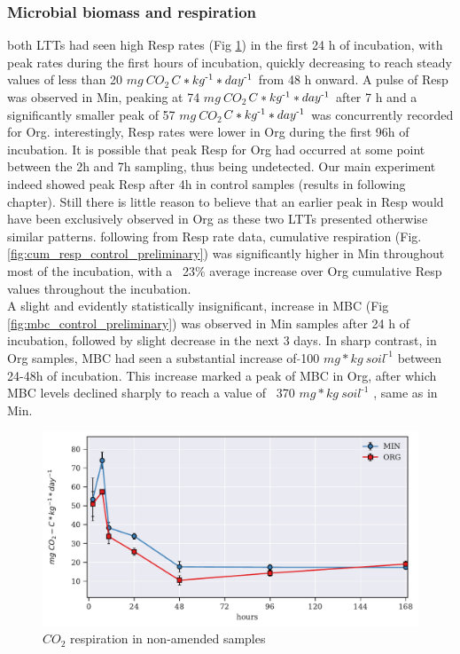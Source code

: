 \documentclass[12pt]{report}
\newlength{\SpaceAfterUnit}
\newcommand{\respunit}{$ mg\ CO_2$\text{-}$C * kg^{\text{-}1} * day^{\text{\text{-}}1}$ \hspace*{\SpaceAfterUnit}}
\newcommand{\genericunit}{$ mg * kg\ soil^{\text{-}1}$ \hspace*{\SpaceAfterUnit}}
\begin{document}
    \subsubsection{Microbial biomass and respiration}
        both LTTs had seen high Resp rates (Fig \ref{fig:resp_control_preliminary}) in the first 24 h of incubation, with peak rates during the first hours of incubation, quickly decreasing to reach steady values of less than 20 \respunit from 48 h onward. A pulse of Resp was observed in Min, peaking at 74   \respunit after 7 h and a significantly smaller peak of 57 \respunit was concurrently recorded for Org. interestingly, Resp rates were lower in Org during the first 96h of incubation. It is possible that peak Resp for Org had occurred at some point between the 2h and 7h  sampling, thus being undetected. Our main experiment indeed showed peak Resp after 4h in control samples (results in following chapter). Still there is little reason to believe that an earlier peak in Resp would have been exclusively observed in Org as these two LTTs presented otherwise similar patterns.
        following from Resp rate data, cumulative respiration (Fig. \ref{fig:cum_resp_control_preliminary}) was significantly higher in Min throughout most of the incubation, with a ~23$\%$ average increase over Org cumulative Resp values throughout the incubation.\\
        A slight and evidently statistically insignificant, increase in MBC (Fig \ref{fig:mbc_control_preliminary}) was observed in Min samples after 24 h of incubation, followed by slight decrease in the next 3 days.  In sharp contrast, in Org samples, MBC had seen a substantial increase of $ \tilde{} $100 \genericunit  between 24-48h of incubation. This increase marked a peak of MBC in Org, after which MBC levels declined sharply to reach a value of ~370 \genericunit, same as in Min.
    \begin{figure}[H]
        \centering
        \includegraphics[scale=0.8]{thesis_figures/preliminary/control/Resp.pdf}
        \caption{$CO_2$ respiration in non-amended samples}
        \label{fig:resp_control_preliminary}
    \end{figure}
    
\end{document}
